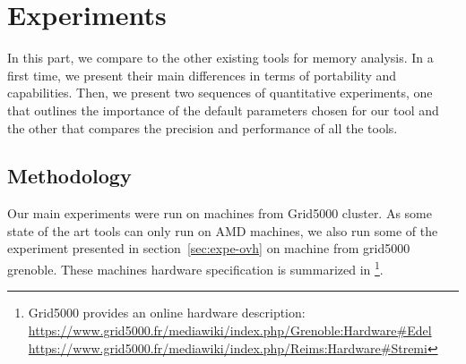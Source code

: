 \section{Experiments}
\label{sec:expe}

In this part, we compare \Moca to the other existing tools for memory analysis. In a first time, we present their main differences in terms of portability
and capabilities. Then, we present two sequences of quantitative experiments, one that outlines the importance of the default parameters chosen for our tool
and the other that compares the precision and performance of all the tools.


\subsection{Methodology}
\label{sec:exp-methodo}


Our main experiments were run on  machines from Grid5000 \Edel
cluster.
    As some state of the art tools can only run on AMD machines, we also run
    some of the experiment presented in section~\ref{sec:expe-ovh} on
    \Stremi machine from grid5000 grenoble.
    These machines hardware specification is summarized in
    \footnote{Grid5000 provides an online hardware description:\\
        \url{https://www.grid5000.fr/mediawiki/index.php/Grenoble:Hardware\#Edel}
        \\\url{https://www.grid5000.fr/mediawiki/index.php/Reims:Hardware\#Stremi}}.

